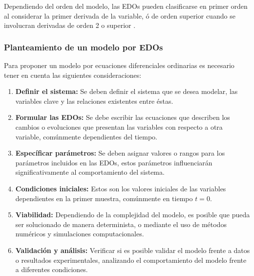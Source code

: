 Dependiendo del orden del modelo, las EDOs pueden clasificarse en primer orden al considerar la primer derivada de la variable, ó de orden superior cuando se involucran derivadas de orden 2 o superior \cite{mathmod1D}. \pagebreak


\subsubsection{Planteamiento de un modelo por EDOs}

Para proponer un modelo por ecuaciones diferenciales ordinarias es necesario tener en cuenta las siguientes consideraciones:
\begin{enumerate}
    \item \textbf{Definir el sistema:} Se deben definir el sistema que se desea modelar, las variables clave y las relaciones existentes entre éstas.
    \item \textbf{Formular las EDOs:} Se debe escribir las ecuaciones que describen los cambios o evoluciones que presentan las variables con respecto a otra variable, comúnmente dependientes del tiempo.
    \item \textbf{Específicar parámetros:} Se deben asignar valores o rangos para los parámetros incluidos en las EDOs, estos parámetros influenciarán significativamente al comportamiento del sistema.
    \item \textbf{Condiciones iniciales:} Estos son los valores iniciales de las variables dependientes en la primer muestra, comúnmente en tiempo $t=0$.
    \item \textbf{Viabilidad:} Dependiendo de la complejidad del modelo, es posible que pueda ser solucionado de manera determinista, o mediante el uso de métodos numéricos y simulaciones computacionales.
    \item \textbf{Validación y análisis:} Verificar si es posible validar el modelo frente a datos o resultados experimentales, analizando el comportamiento del modelo frente a diferentes condiciones.
    
\end{enumerate}


